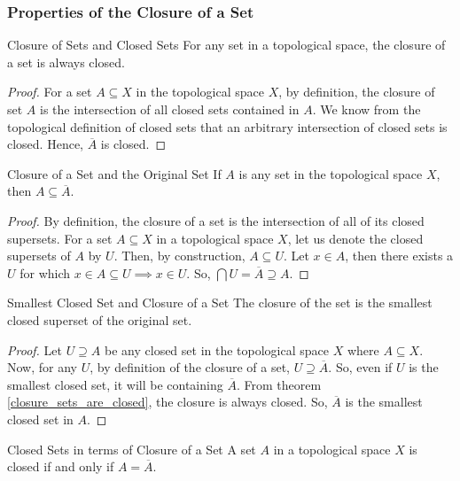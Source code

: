 \subsubsection{Properties of the Closure of a Set}
\begin{Theorem}{Closure of Sets and Closed Sets}\label{closure_sets_are_closed}
    For any set in a topological space, the closure of a set is always closed.
\end{Theorem}
\begin{proof}
    For a set $A\subseteq X$ in the topological space $X$, by definition, the closure of set $A$ is the intersection of all closed sets contained in $A$. We know from the topological definition of closed sets that an arbitrary intersection of closed sets is closed. Hence, $\overline{A}$ is closed.
\end{proof}
\begin{Theorem}{Closure of a Set and the Original Set}\label{closure_original_set}
    If $A$ is any set in the topological space $X$, then $A\subseteq\overline{A}$.
\end{Theorem}
\begin{proof}
    By definition, the closure of a set is the intersection of all of its closed supersets. For a set $A\subseteq X$ in a topological space $X$, let us denote the closed supersets of $A$ by $U$. Then, by construction, $A\subseteq U$. Let $x\in A$, then there exists a $U$ for which $x\in A\subseteq U\implies x\in U$. So, $\bigcap U=\overline{A}\supseteq A$.
\end{proof}
\begin{Theorem}{Smallest Closed Set and Closure of a Set}\label{closure_smallest_set}
    The closure of the set is the smallest closed superset of the original set.
\end{Theorem}
\begin{proof}
    Let $U\supseteq A$ be any closed set in the topological space $X$ where $A\subseteq X$. Now, for any $U$, by definition of the closure of a set, $U\supseteq \overline{A}$. So, even if $U$ is the smallest closed set, it will be containing $\overline{A}$. From theorem \eqref{closure_sets_are_closed}, the closure is always closed. So, $\overline{A}$ is the smallest closed set in $A$.
\end{proof}
\begin{Theorem}{Closed Sets in terms of Closure of a Set}\label{closed_set_in_terms_of_closure}
    A set $A$ in a topological space $X$ is closed if and only if $A=\overline{A}$.
\end{Theorem}
